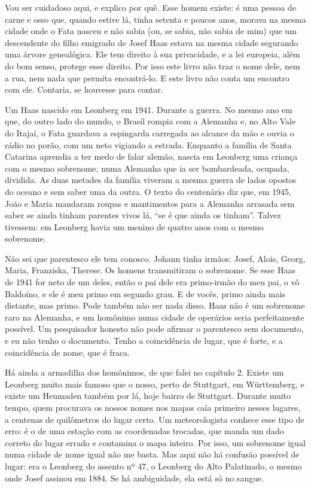 \documentclass[
  brazilian,
  11pt,
  openany]{book}
\begin{document}
Vou ser cuidadoso aqui, e explico por quê. Esse homem existe: é uma
pessoa de carne e osso que, quando estive lá, tinha setenta e poucos
anos, morava na mesma cidade onde o Fata nasceu e não sabia (ou, se
sabia, não sabia de mim) que um descendente do filho emigrado de Josef
Haas estava na mesma cidade segurando uma árvore genealógica. Ele tem
direito à sua privacidade, e a lei europeia, além do bom senso, protege
esse direito. Por isso este livro não traz o nome dele, nem a rua, nem
nada que permita encontrá-lo. E este livro não conta um encontro com
ele. Contaria, se houvesse para contar.

Um Haas nascido em Leonberg em 1941. Durante a guerra. No mesmo ano em
que, do outro lado do mundo, o Brasil rompia com a Alemanha e, no Alto
Vale do Itajaí, o Fata guardava a espingarda carregada ao alcance da mão
e ouvia o rádio no porão, com um neto vigiando a estrada. Enquanto a
família de Santa Catarina aprendia a ter medo de falar alemão, nascia em
Leonberg uma criança com o mesmo sobrenome, numa Alemanha que ia ser
bombardeada, ocupada, dividida. As duas metades da família viveram a
mesma guerra de lados opostos do oceano e sem saber uma da outra. O
texto do centenário diz que, em 1945, João e Maria mandaram roupas e
mantimentos para a Alemanha arrasada sem saber se ainda tinham parentes
vivos lá, ``se é que ainda os tinham''. Talvez tivessem: em Leonberg
havia um menino de quatro anos com o mesmo sobrenome.

Não sei que parentesco ele tem conosco. Johann tinha irmãos: Josef,
Alois, Georg, Maria, Franziska, Therese. Os homens transmitiram o
sobrenome. Se esse Haas de 1941 for neto de um deles, então o pai dele
era primo-irmão do meu pai, o vô Baldoíno, e ele é meu primo em segundo
grau. E de vocês, primo ainda mais distante, mas primo. Pode também não
ser nada disso. Haas não é um sobrenome raro na Alemanha, e um homônimo
numa cidade de operários seria perfeitamente possível. Um pesquisador
honesto não pode afirmar o parentesco sem documento, e eu não tenho o
documento. Tenho a coincidência de lugar, que é forte, e a coincidência
de nome, que é fraca.

Há ainda a armadilha dos homônimos, de que falei no capítulo 2. Existe
um Leonberg muito mais famoso que o nosso, perto de Stuttgart, em
Württemberg, e existe um Heumaden também por lá, hoje bairro de
Stuttgart. Durante muito tempo, quem procurava os nossos nomes nos mapas
caía primeiro nesses lugares, a centenas de quilômetros do lugar certo.
Um meteorologista conhece esse tipo de erro: é o de uma estação com as
coordenadas trocadas, que manda um dado correto do lugar errado e
contamina o mapa inteiro. Por isso, um sobrenome igual numa cidade de
nome igual não me basta. Mas aqui não há confusão possível de lugar: era
o Leonberg do assento nº 47, o Leonberg do Alto Palatinado, o mesmo onde
Josef assinou em 1884. Se há ambiguidade, ela está só no sangue.
\end{document}

